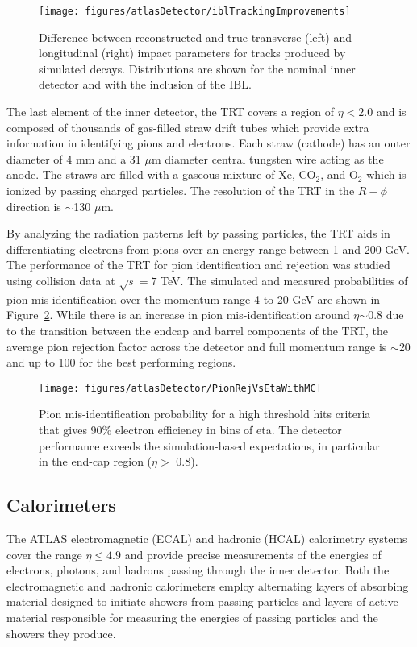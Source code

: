 \begin{figure}[h!]
\centering
\label{fig:iblImprovements}
\texttt{[image: figures/atlasDetector/iblTrackingImprovements]}
\caption{Difference between reconstructed and true transverse (left) and longitudinal (right) impact parameters for tracks produced by simulated \ttbar decays. Distributions are shown for the nominal inner detector and with the inclusion of the IBL.}
\end{figure}

The last element of the inner detector, the TRT covers a region of \textbar$\eta$\textbar $<2.0$ and is composed of thousands of gas-filled straw drift tubes which provide extra information in identifying pions and electrons. Each straw (cathode) has an outer diameter of 4 mm and a 31 $\mu$m diameter central tungsten wire acting as the anode. The straws are filled with a gaseous mixture of Xe, CO$_2$, and O$_2$ which is ionized by passing charged particles. The resolution of the TRT in the $R-\phi$ direction is $\sim$130 $\mu$m.

By analyzing the radiation patterns left by passing particles, the TRT aids in differentiating electrons from pions over an energy range between 1 and 200 GeV. The performance of the TRT for pion identification and rejection was studied using collision data at $\sqrt{s}=7$ TeV\cite{ATLAS-CONF-2011-128}. The simulated and measured probabilities of pion mis-identification over the momentum range 4 to 20 GeV are shown in Figure~\ref{fig:pionRejectionTRT}. While there is an increase in pion mis-identification around \textbar$\eta$\textbar$\sim0.8$ due to the transition between the endcap and barrel components of the TRT, the average pion rejection factor across the detector and full momentum range is $\sim$20 and up to 100 for the best performing regions.

\begin{figure}[h]
\centering
\texttt{[image: figures/atlasDetector/PionRejVsEtaWithMC]}
\label{fig:pionRejectionTRT}
\caption{Pion mis-identification probability for a high threshold hits criteria that gives 90\% electron efficiency in bins of eta. The detector performance exceeds the simulation-based expectations, in particular in the end-cap region (\textbar$\eta$\textbar $>$ 0.8).}
\end{figure}

\subsection{Calorimeters}
The ATLAS electromagnetic (ECAL) and hadronic (HCAL) calorimetry systems cover the range \textbar$\eta$\textbar$\leq 4.9$ and provide precise measurements of the energies of electrons, photons, and hadrons passing through the inner detector. Both the electromagnetic and hadronic calorimeters employ alternating layers of absorbing material designed to initiate showers from passing particles and layers of active material responsible for measuring the energies of passing particles and the showers they produce. 

